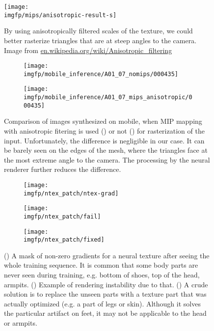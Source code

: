 \begin{figure}
	\centering
	\texttt{[image: \\imgfp/mips/anisotropic-result-s]}
	\caption{By using anisotropically filtered scales of the texture, we could better rasterize triangles that are at steep angles to the camera. Image from \href{https://en.wikipedia.org/wiki/Anisotropic_filtering}{en.wikipedia.org/wiki/Anisotropic\_filtering}}
	\label{fig:anisotropic_result}
\end{figure}
\begin{figure}
	\centering
	\begin{subfigure}[b]{0.49\textwidth}
		\centering
		\texttt{[image: \\imgfp/mobile\_inference/A01\_07\_nomips/000435]}%
		\caption{}
		\label{fig:no_mipmap_inference}
	\end{subfigure}
	\hfill
	\begin{subfigure}[b]{0.49\textwidth}
		\centering
		\texttt{[image: \\imgfp/mobile\_inference/A01\_07\_mips\_anisotropic/000435]}
		\caption{}
		\label{fig:anisotropic_inference}
	\end{subfigure}
	\caption{Comparison of images synthesized on mobile, when MIP mapping with anisotropic fitering is used (\protect{}) or not (\protect{}) for rasterization of the input. Unfortunately, the difference is negligible in our case. It can be barely seen on the edges of the mesh, where the triangles face at the most extreme angle to the camera. The processing by the neural renderer further reduces the difference.}
\end{figure}
\begin{figure}
	\centering
	\begin{subfigure}[b]{0.35\textwidth}
		\centering
		\texttt{[image: \\imgfp/ntex\_patch/ntex-grad]}%
		\caption{}
		\label{fig:ntex-grad}
	\end{subfigure}
	\hfill
	\begin{subfigure}[b]{0.3\textwidth}
		\centering
		\texttt{[image: \\imgfp/ntex\_patch/fail]}
		\caption{}
		\label{fig:ntex-artifact}
	\end{subfigure}
	\hfill
	\begin{subfigure}[b]{0.3\textwidth}
		\centering
		\texttt{[image: \\imgfp/ntex\_patch/fixed]}
		\caption{}
		\label{fig:ntex-fixed}
	\end{subfigure}
	\caption{(\protect{}) A mask of non-zero gradients for a neural texture after seeing the whole training sequence. It is common that some body parts are never seen during training, e.g. bottom of shoes, top of the head, armpits. (\protect{}) Example of rendering instability due to that. (\protect{}) A crude solution is to replace the unseen parts with a texture part that was actually optimized (e.g. a part of legs or skin). Although it solves the particular artifact on feet, it may not be applicable to the head or armpits.}
\end{figure}

